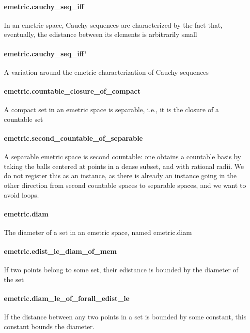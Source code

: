\documentclass{article}
\begin{document}
\paragraph{emetric.cauchy\_seq\_iff}
\par
In an emetric space, Cauchy sequences are characterized by the fact that, eventually,
the edistance between its elements is arbitrarily small
\paragraph{emetric.cauchy\_seq\_iff'}
\par
A variation around the emetric characterization of Cauchy sequences
\paragraph{emetric.countable\_closure\_of\_compact}
\par
A compact set in an emetric space is separable, i.e., it is the closure of a countable set
\paragraph{emetric.second\_countable\_of\_separable}
\par
A separable emetric space is second countable: one obtains a countable basis by taking
the balls centered at points in a dense subset, and with rational radii. We do not register
this as an instance, as there is already an instance going in the other direction
from second countable spaces to separable spaces, and we want to avoid loops.
\paragraph{emetric.diam}
\par
The diameter of a set in an emetric space, named 
\colorbox[RGB]{253,246,227}{{{{\color[RGB]{101, 123, 131} emetric.diam }}}}\paragraph{emetric.edist\_le\_diam\_of\_mem}
\par
If two points belong to some set, their edistance is bounded by the diameter of the set
\paragraph{emetric.diam\_le\_of\_forall\_edist\_le}
\par
If the distance between any two points in a set is bounded by some constant, this constant
bounds the diameter.
\end{document}
